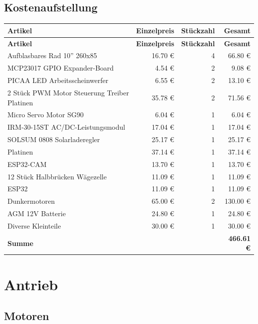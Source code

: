\documentclass[ngerman,12pt,a4paper]{article}
\begin{document}
		\subsection{Kostenaufstellung} %
			\begin{center}
				\begin{longtable}{| p{8.2cm} | r | r | r |}
					\hline
					\textbf{Artikel} & \textbf{Einzelpreis} & \textbf{Stückzahl} & \textbf{Gesamt} \\
					\hline
					\endfirsthead
					\hline
					\textbf{Artikel} & \textbf{Einzelpreis} & \textbf{Stückzahl} & \textbf{Gesamt} \\
					\hline
					\endhead
					\hline
					Aufblasbares Rad 10'' 260x85  & 16.70 € & 4 & 66.80 € \\ \hline
					MCP23017 GPIO Expander-Board & 4.54 € & 2 & 9.08 € \\ \hline
					PICAA LED Arbeitsscheinwerfer & 6.55 € & 2 & 13.10 € \\ \hline
					2 Stück PWM Motor Steuerung Treiber Platinen & 35.78 € & 2 & 71.56 € \\ \hline
					Micro Servo Motor SG90 & 6.04 € & 1 & 6.04 € \\ \hline
					IRM-30-15ST AC/DC-Leistungsmodul & 17.04 € & 1 & 17.04 € \\ \hline
					SOLSUM 0808 Solarladeregler & 25.17 € & 1 & 25.17 € \\ \hline
					Platinen & 37.14 € & 1 & 37.14 € \\ \hline
					ESP32-CAM & 13.70 € & 1 & 13.70 € \\ \hline
					12 Stück Halbbrücken Wägezelle & 11.09 € & 1 & 11.09 € \\ \hline
					ESP32 & 11.09 € & 1 & 11.09 € \\ \hline
					Dunkermotoren & 65.00 € & 2 & 130.00 € \\ \hline
					AGM 12V Batterie & 24.80 € & 1 & 24.80 € \\ \hline
					Diverse Kleinteile & 30.00 € & 1 & 30.00 € \\ \hline
					\textbf{Summe} & & & \textbf{466.61 €} \\
					\hline
				\end{longtable}
			\end{center}
			\newpage
	\section{Antrieb}
	
		\subsection{Motoren} %
		
\end{document}
